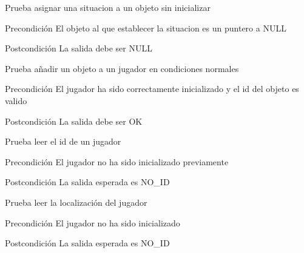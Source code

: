 \begin{DoxyRefList}
\item[\label{test__test000176}%
\hypertarget{test__test000176}{}%
Global \hyperlink{object__test_8c_a53d70593e55ce31aa7f54848e931d05c}{test2\-\_\-object\-\_\-set\-\_\-\-Open} ()]Prueba asignar una situacion a un objeto sin inicializar \begin{DoxyPrecond}{Precondición}
El objeto al que establecer la situacion es un puntero a N\-U\-L\-L 
\end{DoxyPrecond}
\begin{DoxyPostcond}{Postcondición}
La salida debe ser N\-U\-L\-L  
\end{DoxyPostcond}

\item[\label{test__test000223}%
\hypertarget{test__test000223}{}%
Global \hyperlink{player__test_8c_a864d3935cf61953950b10df0e656306d}{test2\-\_\-player\-\_\-add\-\_\-object} ()]Prueba añadir un objeto a un jugador en condiciones normales \begin{DoxyPrecond}{Precondición}
El jugador ha sido correctamente inicializado y el id del objeto es valido 
\end{DoxyPrecond}
\begin{DoxyPostcond}{Postcondición}
La salida debe ser O\-K  
\end{DoxyPostcond}

\item[\label{test__test000214}%
\hypertarget{test__test000214}{}%
Global \hyperlink{player__test_8c_a9fa80f0c0e46b45eb9f1685b102a5826}{test2\-\_\-player\-\_\-get\-\_\-id} ()]Prueba leer el id de un jugador \begin{DoxyPrecond}{Precondición}
El jugador no ha sido inicializado previamente 
\end{DoxyPrecond}
\begin{DoxyPostcond}{Postcondición}
La salida esperada es N\-O\-\_\-\-I\-D  
\end{DoxyPostcond}

\item[\label{test__test000220}%
\hypertarget{test__test000220}{}%
Global \hyperlink{player__test_8c_a4c5605fac4bd716e1dfb2744db4fa8a1}{test2\-\_\-player\-\_\-get\-\_\-location} ()]Prueba leer la localización del jugador \begin{DoxyPrecond}{Precondición}
El jugador no ha sido inicializado 
\end{DoxyPrecond}
\begin{DoxyPostcond}{Postcondición}
La salida esperada es N\-O\-\_\-\-I\-D  
\end{DoxyPostcond}


\end{DoxyRefList}
